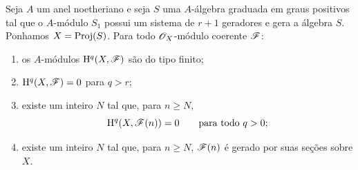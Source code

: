 \begin{proposition}[2.2.2]
\label{III.2.2.2}
Seja $A$ um anel noetheriano e seja $S$ uma $A$-álgebra graduada em graus positivos tal que o $A$-módulo $S_1$ possui um sistema de $r+1$ geradores e gera a álgebra $S$.
Ponhamos $X=\operatorname{Proj}(S)$.
Para todo $\mathscr{O}_X$-módulo coerente $\mathscr{F}$:
\begin{enumerate}
  \item[{\rm(i) }] os $A$-módulos $\mathrm{H}^q(X,\mathscr{F})$ são do tipo finito;
  \item[{\rm(ii) }] $\mathrm{H}^q(X,\mathscr{F})=0$ para $q>r$;
  \item[{\rm(iii) }] existe um inteiro $N$ tal que, para $n\geq N$,
  \[
    \mathrm{H}^q(X,\mathscr{F}(n))=0
    \qquad\text{para todo }q>0;
  \]
  \item[{\rm(iv) }] existe um inteiro $N$ tal que, para $n\geq N$, $\mathscr{F}(n)$ é gerado por suas seções sobre $X$.
\end{enumerate}
\end{proposition}

